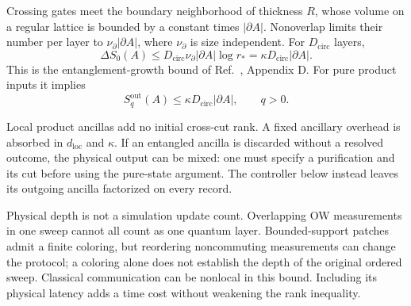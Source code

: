 \documentclass[aps,prb,onecolumn,nofootinbib,superscriptaddress]{revtex4-2}
\begin{document}
Crossing gates meet the boundary neighborhood of thickness $R$, whose
volume on a regular lattice is bounded by a constant times $|\partial A|$.
Nonoverlap limits their number per layer to
$\nu_\partial|\partial A|$, where $\nu_\partial$ is size independent.
For $D_{\mathrm{circ}}$ layers,
\begin{equation}
 \Delta S_0(A)\leq D_{\mathrm{circ}}\nu_\partial|\partial A|\log r_*
 =\kappa D_{\mathrm{circ}}|\partial A|.
 \label{eq:depth-bound}
\end{equation}
This is the entanglement-growth bound of Ref.~\cite{LuLessaKimHsieh2022},
Appendix D. For pure product inputs it implies
\begin{equation}
 S_q^{\mathrm{out}}(A)\leq\kappa D_{\mathrm{circ}}|\partial A|,
 \qquad q>0.
 \label{eq:renyi-bound}
\end{equation}

Local product ancillas add no initial cross-cut rank. A fixed ancillary
overhead is absorbed in $d_{\mathrm{loc}}$ and $\kappa$. If an entangled
ancilla is discarded without a resolved outcome, the physical output can
be mixed: one must specify a purification and its cut before using the
pure-state argument. The controller below instead leaves its outgoing
ancilla factorized on every record.

Physical depth is not a simulation update count. Overlapping OW
measurements in one sweep cannot all count as one quantum layer.
Bounded-support patches admit a finite coloring, but reordering
noncommuting measurements can change the protocol; a coloring alone does
not establish the depth of the original ordered sweep. Classical
communication can be nonlocal in this bound. Including its physical
latency adds a time cost without weakening the rank inequality.
\end{document}
